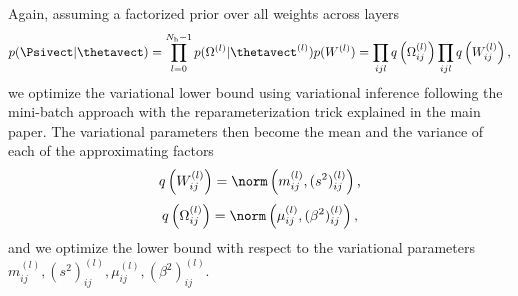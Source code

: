 Again, assuming a factorized prior over all weights across layers
\begin{equation}
p(\Psivect | \thetavect) = \prod_{l=0}^{N_{\mathrm{h}} - 1} p(\Omega^{(l)} | \thetavect^{(l)}) p(W^{(l)}) = \prod_{ijl} q\left(\Omega^{(l)}_{ij}\right) \prod_{ijl} q\left(W^{(l)}_{ij}\right) \text{,}
\end{equation}
we optimize the variational lower bound using variational inference following the mini-batch approach with the reparameterization trick explained in the main paper.
The variational parameters then become the mean and the variance of each of the approximating factors
\begin{equation}
q\left(W^{(l)}_{ij}\right) = \norm\left(m^{(l)}_{ij}, (s^2)^{(l)}_{ij} \right) \text{,}
\end{equation}
\begin{equation}
q\left(\Omega^{(l)}_{ij}\right) = \norm\left(\mu^{(l)}_{ij}, (\beta^2)^{(l)}_{ij} \right) \text{,}
\end{equation}
and we optimize the lower bound with respect to the variational parameters $m^{(l)}_{ij}, (s^2)^{(l)}_{ij}, \mu^{(l)}_{ij}, (\beta^2)^{(l)}_{ij}$. %



